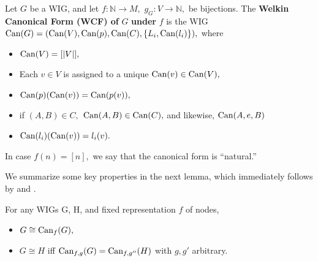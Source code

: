 \begin{definition}
  Let $G$ be a WIG, and let $f: \mathbb{N} \to M,$ $g_{G}: V \to \mathbb{N},$ be bijections. The \textbf{Welkin Canonical Form (WCF) of} $G$ \textbf{under} $f$ is the WIG $\textrm{Can}(G) = (\textrm{Can}(V), \textrm{Can}(p), \textrm{Can}(C), \{L_{i}, \textrm{Can}(l_{i})\}),$
  where
  \begin{itemize}
    \item $\textrm{Can}(V) = [|V|],$
    \item Each $v \in V$ is assigned to a unique $\textrm{Can}(v) \in \textrm{Can}(V),$
    \item $\textrm{Can}(p)(\textrm{Can}(v)) = \textrm{Can}(p(v)),$
    \item if $(A, B) \in C,$ $\textrm{Can}(A, B) \in \textrm{Can}(C),$ and likewise, $\textrm{Can}(A, e, B) $
    \item $\textrm{Can}(l_{i})(\textrm{Can}(v)) = l_{i}(v).$
  \end{itemize}
In case $f(n) = [n],$ we say that the canonical form is ``natural.''
\end{definition}
\label{def:iso}

We summarize some key properties in the next lemma, which immediately follows by \label{def:iso} and \label{lemma:closure}.

\begin{lemma}
  For any WIGs G, H, and fixed representation $f$ of nodes,
  \begin{itemize}
    \item $G \cong \textrm{Can}_{f}(G),$
    \item $G \cong H$ iff $\textrm{Can}_{f, g}(G) = \textrm{Can}_{f, g''}(H)$ with $g, g'$ arbitrary.
  \end{itemize}
\end{lemma}




